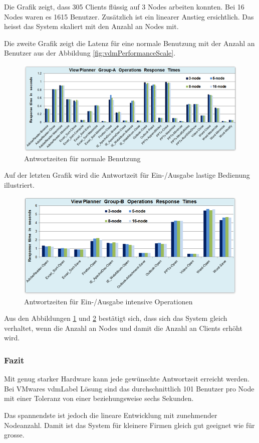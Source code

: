Die Grafik zeigt, dass 305 Clients flüssig auf 3 Nodes arbeiten konnten. Bei 16 Nodes waren es 1615 Benutzer. Zusätzlich ist ein linearer Anstieg ersichtlich. Das heisst das System skaliert mit den Anzahl an Nodes mit.

Die zweite Grafik zeigt die Latenz für eine normale Benutzung mit der Anzahl an Benutzer aus der Abbildung \ref{fig:vdmPerformanceScale}.
\begin{figure}[H]
	\includegraphics[width=\textwidth]{images/vmware-vdm-performance-normal}
	\caption{Antwortzeiten für normale Benutzung}
	\label{fig:vdmPerformanceNormal}
\end{figure}

Auf der letzten Grafik wird die Antwortzeit für Ein-/Ausgabe lastige Bedienung illustriert.
\begin{figure}[H]
	\includegraphics[width=\textwidth]{images/vmware-vdm-performance-io}
	\caption{Antwortzeiten für Ein-/Ausgabe intensive Operationen}
	\label{fig:vdmPerformanceIo}
\end{figure}

Aus den Abbildungen \ref{fig:vdmPerformanceNormal} und \ref{fig:vdmPerformanceIo} bestätigt sich, dass sich das System gleich verhaltet, wenn die Anzahl an Nodes und damit die Anzahl an Clients erhöht wird.

\subsubsection{Fazit}
Mit genug starker Hardware kann jede gewünschte Antwortzeit erreicht werden. Bei VMwares \Gls{vdmLabel} Lösung sind das durchschnittlich 101 Benutzer pro Node mit einer Toleranz von einer beziehungsweise sechs Sekunden.

Das spannendste ist jedoch die lineare Entwicklung mit zunehmender Nodeanzahl. Damit ist das System für kleinere Firmen gleich gut geeignet wie für grosse.
